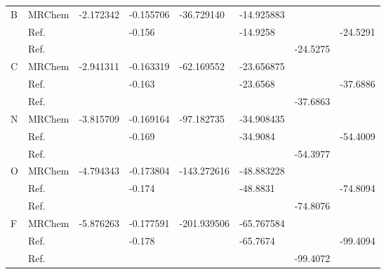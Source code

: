 \begin{table}
\begin{center}
\begin{tabular}{ll|ll|llll}
\hline                                                      
B   & MRChem			&  -2.172342    &  -0.155706    &  -36.729140   & -14.925883    &	        &	        \\
    & Ref.\cite{Chan:2000}	&	        &  -0.156       &               & -14.9258      &	        &  -24.5291     \\
    & Ref.\cite{Karasiev:2012}	&	        &               &               &               &  -24.5275     &	        \\
\hline                                                      
C   & MRChem			&  -2.941311    &  -0.163319    &  -62.169552   & -23.656875    &	        &	        \\
    & Ref.\cite{Chan:2000}	&	        &  -0.163       &               & -23.6568      &	        &  -37.6886     \\
    & Ref.\cite{Karasiev:2012}	&	        &               &               &               &  -37.6863     &	        \\
\hline                                                      
N   & MRChem			&  -3.815709    &  -0.169164    &  -97.182735   & -34.908435    &	        &	        \\
    & Ref.\cite{Chan:2000}	&	        &  -0.169       &               & -34.9084      &	        &  -54.4009     \\
    & Ref.\cite{Karasiev:2012}  &	        &               &               &               &  -54.3977     &	        \\
\hline                                                      
O   & MRChem			&  -4.794343    &  -0.173804    & -143.272616   & -48.883228    &	        &	        \\
    & Ref.\cite{Chan:2000}	&	        &  -0.174       &               & -48.8831      &	        &  -74.8094     \\
    & Ref.\cite{Karasiev:2012}  &		&               &               &               &  -74.8076     &	        \\
\hline                                                      
F   & MRChem			&  -5.876263    &  -0.177591    & -201.939506   & -65.767584    &	        &	        \\
    & Ref.\cite{Chan:2000}	&	        &  -0.178       &               & -65.7674      &	        &  -99.4094     \\
    & Ref.\cite{Karasiev:2012}  &	        &	        &               &               &  -99.4072     &	        \\
\hline                                                      

\end{tabular}
\end{center}
\end{table}
